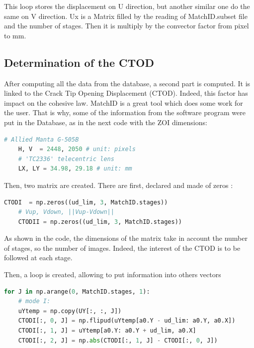 This loop stores the displacement on U direction, but another similar one do the same on V direction. Ux is a Matrix filled by the reading of MatchID.subset file and the number of stages. Then it is multiply by the convector factor from pixel to \si{\milli\meter}. 


\subsection{Determination of the CTOD} 

After computing all the data from the database, a second part is computed. It is linked to the Crack Tip Opening Displacement (CTOD). Indeed, this factor has impact on the cohesive law. MatchID is a great tool which does some work for the user. That is why, some of the information from the software program were put in the Database, as in the next code with the ZOI dimensions: 
\begin{lstlisting}[language=Python]
	# Allied Manta G-505B
	H, V  = 2448, 2050 # unit: pixels
	# 'TC2336' telecentric lens
	LX, LY = 34.98, 29.18 # unit: mm
\end{lstlisting}

Then, two matrix are created. There are first, declared and made of zeros :

\begin{lstlisting}[language=Python]
	CTODI  = np.zeros((ud_lim, 3, MatchID.stages))
	# Vup, Vdown, ||Vup-Vdown||
	CTODII = np.zeros((ud_lim, 3, MatchID.stages))
\end{lstlisting}

As shown in the code, the dimensions of the matrix take in account the number of stages, so the number of images. Indeed, the interest of the CTOD is to be followed at each stage. 

Then, a loop is created, allowing to put information into others vectors

\begin{lstlisting}[language=Python]
	for J in np.arange(0, MatchID.stages, 1):
	# mode I:
	uYtemp = np.copy(UY[:, :, J])
	CTODI[:, 0, J] = np.flipud(uYtemp[a0.Y - ud_lim: a0.Y, a0.X])
	CTODI[:, 1, J] = uYtemp[a0.Y: a0.Y + ud_lim, a0.X]
	CTODI[:, 2, J] = np.abs(CTODI[:, 1, J] - CTODI[:, 0, J])
\end{lstlisting}

